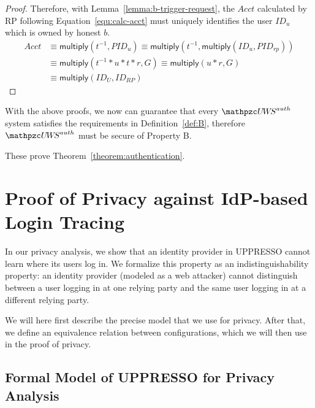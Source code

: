 \begin{proof}
    Therefore, with Lemma~\ref{lemma:b-trigger-request}, the $Acct$ calculated by RP following Equation~\ref{equ:calc-acct} must uniquely identifies the user $ID_u$ which is owned by honest $b$.  
    \begin{equation}\label{equ:calc-acct}
    \begin{split}
      Acct& \equiv \mathsf{multiply}(t^{-1}, PID_u) \equiv \mathsf{multiply}(t^{-1}, \mathsf{multiply}(ID_u, PID_{rp})) \\
      & \equiv \mathsf{multiply}(t^{-1}*u*t*r, G)  \equiv \mathsf{multiply}(u*r, G)\\
      & \equiv \mathsf{multiply}(ID_U, ID_{RP})
      \end{split}
    \end{equation}
  \end{proof}

 
  With the above proofs, we now can guarantee that every 
  $\uppressoauthwebsystem$ system satisfies the requirements in 
  Definition~\ref{def:B}, therefore $\uppressoauthwebsystem$ 
  must be secure of Property B.
  
  These prove Theorem~\ref{theorem:authentication}.\QED
  
  \section{Proof of Privacy against IdP-based Login Tracing}
  
  In our privacy analysis, we show that an identity provider in UPPRESSO cannot learn 
  where its users log in. We formalize this property as an indistinguishability 
  property: an identity provider (modeled as a web attacker) cannot distinguish 
  between a user logging in at one relying party and the same user logging in at 
  a different relying party.
  
  We will here first describe the precise model that we use for privacy.
  After that, we define an equivalence relation between configurations,
  which we will then use in the proof of privacy.
  
  \subsection{Formal Model of UPPRESSO for Privacy Analysis}
  
